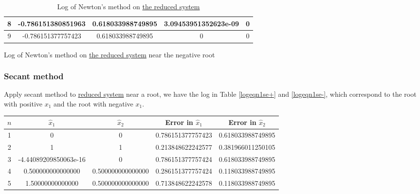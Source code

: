 \begin{table}[H]
\begin{table}[H]
\begin{table}[H]
\begin{table}[htbp]
\begin{subtable}[t]{\textwidth}
\begin{tabular}{|c|c|c|c|c|}
		8	&	\footnotesize	-0.786151380851963	&	\footnotesize	0.618033988749895	&	\footnotesize	3.09453951352623e-09	&	\footnotesize	0						\\	\hline
		9	&	\footnotesize	-0.786151377757423	&	\footnotesize	0.618033988749895	&	\footnotesize	0						&	\footnotesize	0						\\	\hline
		\end{tabular}
		\caption{Log of Newton's method on \hyperref[eqn1reduce]{the reduced system} near the negative root}
		\label{logeqn1nt-}
	\end{subtable}
	\caption{Log of Newton's method on \hyperref[eqn1reduce]{the reduced system}}
	\label{logeqn1nt}
	\end{table}




\subsubsection{Secant method}
Apply secant method to \hyperref[eqn1reduce]{reduced system} near a root, we have the log in Table \ref{logeqn1se+} and \ref{logeqn1se-}, which correspond to the root with positive \(x_1\) and the root with negative \(x_1\).
\ifnum{}
	\begin{table}[H]
\else
	\begin{table}[htbp]
\fi
	\centering
	\begin{subtable}[t]{\textwidth}
		\centering
		\begin{tabular}{|c|c|c|c|c|}
		\hline
		\(n\)	&	\(\hat{x}_1\)	&	\(\hat{x}_2\)	&	Error in \(\hat{x}_1\)	&	Error in \(\hat{x}_2\)		\\	\hline
		1	&	\footnotesize	0						&	\footnotesize	0					&	\footnotesize	0.786151377757423		&	\footnotesize	0.618033988749895		\\	\hline
		2	&	\footnotesize	1						&	\footnotesize	1					&	\footnotesize	0.213848622242577		&	\footnotesize	0.381966011250105		\\	\hline
		3	&	\footnotesize	-4.44089209850063e-16	&	\footnotesize	0					&	\footnotesize	0.786151377757424		&	\footnotesize	0.618033988749895		\\	\hline
		4	&	\footnotesize	0.500000000000000		&	\footnotesize	0.500000000000000	&	\footnotesize	0.286151377757424		&	\footnotesize	0.118033988749895		\\	\hline
		5	&	\footnotesize	1.50000000000000		&	\footnotesize	0.500000000000000	&	\footnotesize	0.713848622242578		&	\footnotesize	0.118033988749895		\\	\hline

\end{tabular}
\end{subtable}
\end{table}
\end{table}
\end{table}
\end{table}
\end{table}
